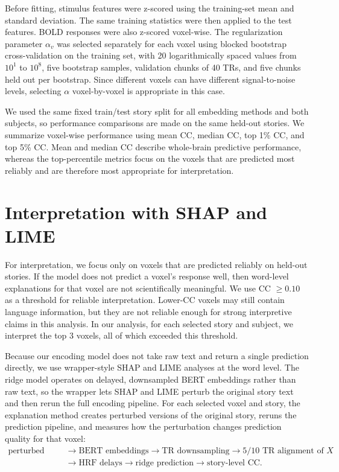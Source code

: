 \documentclass[11pt]{article}
\begin{document}
Before fitting, stimulus features were z-scored using the training-set mean and standard deviation. The same training statistics were then applied to the test features. BOLD responses were also z-scored voxel-wise. The regularization parameter $\alpha_v$ was selected separately for each voxel using blocked bootstrap cross-validation on the training set, with 20 logarithmically spaced values from $10^1$ to $10^8$, five bootstrap samples, validation chunks of 40 TRs, and five chunks held out per bootstrap. Since different voxels can have different signal-to-noise levels, selecting $\alpha$ voxel-by-voxel is appropriate in this case.

We used the same fixed train/test story split for all embedding methods and both subjects, so performance comparisons are made on the same held-out stories. We summarize voxel-wise performance using mean CC, median CC, top 1\% CC, and top 5\% CC. Mean and median CC describe whole-brain predictive performance, whereas the top-percentile metrics focus on the voxels that are predicted most reliably and are therefore most appropriate for interpretation.

\section{Interpretation with SHAP and LIME}
\label{sec:interpretation-methods}
For interpretation, we focus only on voxels that are predicted reliably on held-out stories. If the model does not predict a voxel's response well, then word-level explanations for that voxel are not scientifically meaningful. We use CC $\geq 0.10$ as a threshold for reliable interpretation. Lower-CC voxels may still contain language information, but they are not reliable enough for strong interpretive claims in this analysis. In our analysis, for each selected story and subject, we interpret the top 3 voxels, all of which exceeded this threshold.

Because our encoding model does not take raw text and return a single prediction directly, we use wrapper-style SHAP and LIME analyses at the word level. The ridge model operates on delayed, downsampled BERT embeddings rather than raw text, so the wrapper lets SHAP and LIME perturb the original story text and then rerun the full encoding pipeline. For each selected voxel and story, the explanation method creates perturbed versions of the original story, reruns the prediction pipeline, and measures how the perturbation changes prediction quality for that voxel:
\[
\begin{aligned}
\text{perturbed story}
&\rightarrow \text{BERT embeddings}
\rightarrow \text{TR downsampling}
\rightarrow \text{5/10 TR alignment of } X \\
&\rightarrow \text{HRF delays}
\rightarrow \text{ridge prediction}
\rightarrow \text{story-level CC}.
\end{aligned}
\]
\end{document}
